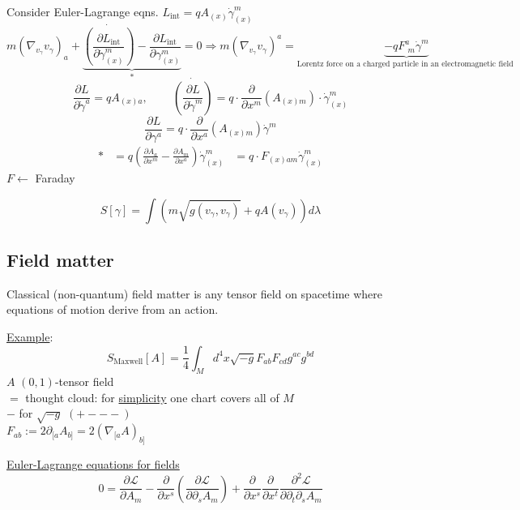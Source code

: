 Consider Euler-Lagrange eqns. $L_{\text{int}} = q A_{(x)} \dot{\gamma}^m_{(x)}$
\[
m (\nabla_{v_{\gamma}} v_{\gamma})_a + \underbrace{ \dot{ \left( \frac{ \partial L_{\text{int}} }{ \partial \dot{\gamma}^m_{(x)} } \right) }- \frac{ \partial L_{\text{int}} }{ \partial \gamma^m_{(x)} } }_{*} = 0  \Longrightarrow \boxed{ m (\nabla_{v_{\gamma} } v_{\gamma})^a = \underbrace{ -q F^a_{ \, \, m } \dot{\gamma}^m }_{\text{Lorentz force on a charged particle in an electromagnetic field } } }
\]
\[
\frac{ \partial L}{ \partial \dot{\gamma}^a} = qA_{(x)a}, \quad \quad \, \dot{ \left( \frac{ \partial L}{ \partial \dot{\gamma}^m} \right) } = q \cdot \frac{ \partial }{ \partial x^m} (A_{(x)m} ) \cdot \dot{\gamma}^m_{(x)}
\]
\[
\frac{ \partial L}{ \partial \gamma^a} = q \cdot \frac{ \partial }{ \partial x^a} (A_{(x)m} ) \dot{\gamma}^m
\]
\[
\begin{aligned}
* & = q\left( \frac{ \partial A_a}{ \partial x^m} - \frac{ \partial A_m}{ \partial x^a} \right) \dot{\gamma}^m_{(x)}
& = q \cdot F_{(x)am} \dot{\gamma}^m_{(x)}
\end{aligned}
\]
$F \leftarrow $ Faraday

\[
S[\gamma] = \int(m\sqrt{g(v_{\gamma},v_{\gamma} ) } + q A(v_{\gamma}) ) d\lambda
\]

\subsection{Field matter}

\begin{definition}
  Classical (non-quantum) field matter is any tensor field on spacetime where equations of motion derive from an action.
\end{definition}

\underline{Example}: 
\[
S_{\text{Maxwell}}[A] = \frac{1}{4}\int_M d^4x \sqrt{-g}F_{ab}F_{cd}g^{ac}g^{bd}
\]
$A$ $(0,1)$-tensor field \\
$=$ thought cloud: for \underline{simplicity} one chart covers all of $M$ \\
$-$ for $\sqrt{-g}$ $(+---)$ \\

$F_{ab} := 2\partial_{[a}A_{b]} = 2(\nabla_{[a} A)_{b]}$

\underline{Euler-Lagrange equations for fields}
\[
0 = \frac{ \partial \mathcal{L}}{ \partial A_m} - \frac{ \partial }{ \partial x^s} \left( \frac{ \partial \mathcal{L}}{ \partial \partial _s A_m } \right) + \frac{ \partial }{ \partial x^s} \frac{ \partial }{ \partial x^t} \frac{ \partial^2 \mathcal{L}}{ \partial \partial_t \partial_s A_m }
\]

